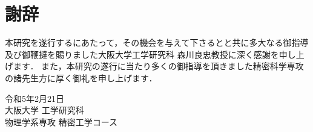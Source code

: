 \chapter*{謝辞}
本研究を遂行するにあたって，その機会を与えて下さるとと共に多大なる御指導及び御鞭撻を賜りました大阪大学工学研究科 森川良忠教授に深く感謝を申し上げます．
また，本研究の遂行に当たり多くの御指導を頂きました精密科学専攻の諸先生方に厚く御礼を申し上げます．

\vspace{20mm}

\begin{minipage}{0.65\textwidth}
\end{minipage}
\begin{minipage}{0.35\textwidth}
    \centering
    令和5年2月21日\\
    大阪大学 工学研究科 \\
    物理学系専攻 精密工学コース %
\end{minipage}